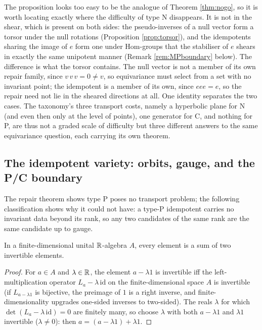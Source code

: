 \begin{remark}[Why the shear has nothing to act on: $eee = e$ versus $vvv = 0$]\label{rem:fixedpoint}
The proposition looks too easy to be the analogue of Theorem \ref{thm:nogo}, so it is worth locating exactly where the difficulty of type N disappears. It is not in the shear, which is present on both sides: the pseudo-inverses of a null vector form a torsor under the null rotations (Proposition \ref{prop:torsor}), and the idempotents sharing the image of $e$ form one under $\mathrm{Hom}$-groups that the stabiliser of $e$ shears in exactly the same unipotent manner (Remark \ref{rem:MPboundary} below). The difference is what the torsor contains. The null vector is not a member of its own repair family, since $v\,v\,v = 0 \neq v$, so equivariance must select from a set with no invariant point; the idempotent is a member of its own, since $eee = e$, so the repair need not lie in the sheared directions at all. One identity separates the two cases. The taxonomy's three transport costs, namely a hyperbolic plane for N (and even then only at the level of points), one generator for C, and nothing for P, are thus not a graded scale of difficulty but three different answers to the same equivariance question, each carrying its own theorem.
\end{remark}

\subsection{The idempotent variety: orbits, gauge, and the P/C boundary}\label{subsec:orbits}

The repair theorem shows type P poses no transport problem; the following classification shows why it could not have: a type-P idempotent carries no invariant data beyond its rank, so any two candidates of the same rank are the same candidate up to gauge.

\begin{lemma}\label{lem:sumofunits}
In a finite-dimensional unital $\mathbb{R}$-algebra $A$, every element is a sum of two invertible elements.
\end{lemma}

\begin{proof}
For $a \in A$ and $\lambda \in \mathbb{R}$, the element $a - \lambda 1$ is invertible iff the left-multiplication operator $L_a - \lambda\, \mathrm{id}$ on the finite-dimensional space $A$ is invertible (if $L_{a - \lambda 1}$ is bijective, the preimage of $1$ is a right inverse, and finite-dimensionality upgrades one-sided inverses to two-sided). The reals $\lambda$ for which $\det(L_a - \lambda\,\mathrm{id}) = 0$ are finitely many, so choose $\lambda$ with both $a - \lambda 1$ and $\lambda 1$ invertible ($\lambda \neq 0$): then $a = (a - \lambda 1) + \lambda 1$.
\end{proof}

